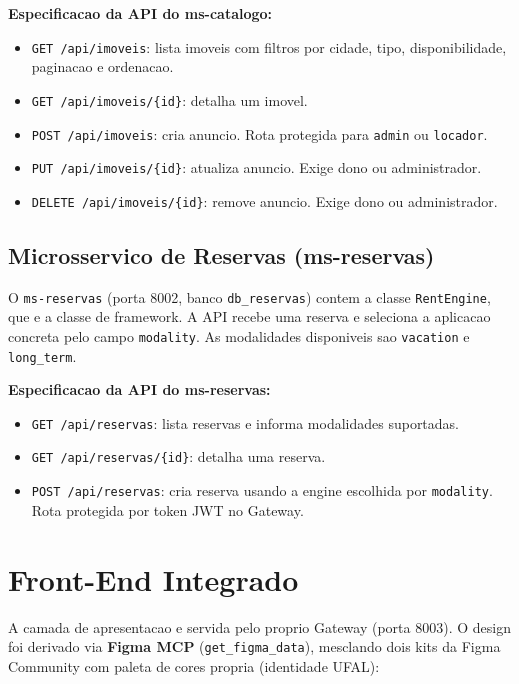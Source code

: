 \documentclass[12pt,a4paper]{article}
\begin{document}
\textbf{Especificacao da API do ms-catalogo:}
\begin{itemize}
    \item \texttt{GET /api/imoveis}: lista imoveis com filtros por cidade, tipo,
    disponibilidade, paginacao e ordenacao.
    \item \texttt{GET /api/imoveis/\{id\}}: detalha um imovel.
    \item \texttt{POST /api/imoveis}: cria anuncio. Rota protegida para
    \texttt{admin} ou \texttt{locador}.
    \item \texttt{PUT /api/imoveis/\{id\}}: atualiza anuncio. Exige dono ou
    administrador.
    \item \texttt{DELETE /api/imoveis/\{id\}}: remove anuncio. Exige dono ou
    administrador.
\end{itemize}

\subsection{Microsservico de Reservas (ms-reservas)}
O \texttt{ms-reservas} (porta 8002, banco \texttt{db\_reservas}) contem a classe
\texttt{RentEngine}, que e a classe de framework. A API recebe uma reserva e seleciona
a aplicacao concreta pelo campo \texttt{modality}. As modalidades disponiveis sao
\texttt{vacation} e \texttt{long\_term}.

\textbf{Especificacao da API do ms-reservas:}
\begin{itemize}
    \item \texttt{GET /api/reservas}: lista reservas e informa modalidades suportadas.
    \item \texttt{GET /api/reservas/\{id\}}: detalha uma reserva.
    \item \texttt{POST /api/reservas}: cria reserva usando a engine escolhida por
    \texttt{modality}. Rota protegida por token JWT no Gateway.
\end{itemize}

\section{Front-End Integrado}
A camada de apresentacao e servida pelo proprio Gateway (porta 8003). O design foi
derivado via \textbf{Figma MCP} (\texttt{get\_figma\_data}), mesclando dois kits da
Figma Community com paleta de cores propria (identidade UFAL):
\end{document}
